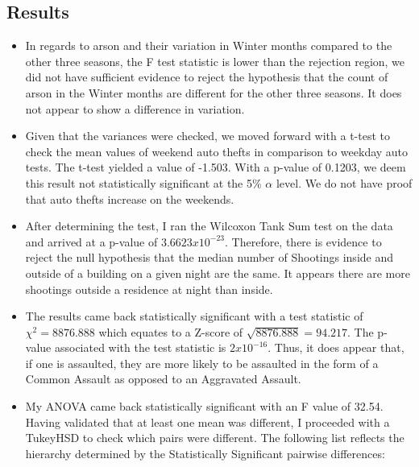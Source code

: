 \documentclass{article}
\begin{document}
\subsection*{Results}
\begin{itemize}
\item In regards to arson and their variation in Winter months compared to the other three seasons, the F test statistic is lower than the rejection region, we did not have sufficient evidence to reject the hypothesis that the count of arson in the Winter months are different for the other three seasons.  It does not appear to show a difference in variation.

\item Given that the variances were checked, we moved forward with a t-test to check the mean values of weekend auto thefts in comparison to weekday auto tests.  The t-test yielded a value of -1.503.  With a p-value of 0.1203, we deem this result not statistically significant at the 5\% $\alpha$ level.  We do not have proof that auto thefts increase on the weekends. 

\item After determining the test, I ran the Wilcoxon Tank Sum test on the data and arrived at a p-value of $3.6623x10^{-23}$.  Therefore, there is evidence to reject the null hypothesis that the median number of Shootings inside and outside of a building on a given night are the same.  It appears there are more shootings outside a residence at night than inside.   

\item The results came back statistically significant with a test statistic of $\chi^{2} = 8876.888$ which equates to a Z-score of $\sqrt{8876.888} = 94.217$.  The p-value associated with the test statistic is $2x10^{-16}$.  Thus, it does appear that, if one is assaulted, they are more likely to be assaulted in the form of a Common Assault as opposed to an Aggravated Assault.  

\item  My ANOVA came back statistically significant with an F value of 32.54.  Having validated that at least one mean was different, I proceeded with a TukeyHSD to check which pairs were different.  The following list reflects the hierarchy determined by the Statistically Significant pairwise differences: 
\end{itemize}
\end{document}
